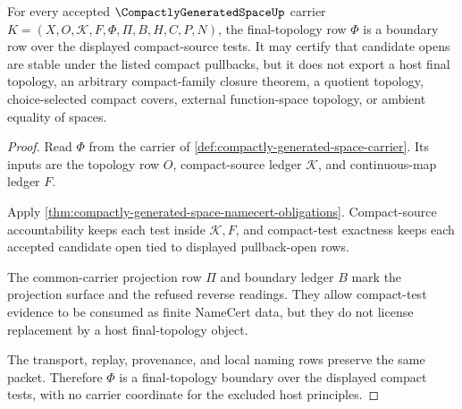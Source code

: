 \begin{theorem}\label{thm:compactly-generated-space-final-topology-boundary}
For every accepted $\CompactlyGeneratedSpaceUp$ carrier $K=(X,O,\mathcal K,F,\Phi,\Pi,B,H,C,P,N)$, the final-topology row $\Phi$ is a boundary row over the displayed compact-source tests. It may certify that candidate opens are stable under the listed compact pullbacks, but it does not export a host final topology, an arbitrary compact-family closure theorem, a quotient topology, choice-selected compact covers, external function-space topology, or ambient equality of spaces.
\end{theorem}
\begin{proof}
Read $\Phi$ from the carrier of \autoref{def:compactly-generated-space-carrier}. Its inputs are the topology row $O$, compact-source ledger $\mathcal K$, and continuous-map ledger $F$.

Apply \autoref{thm:compactly-generated-space-namecert-obligations}. Compact-source accountability keeps each test inside $\mathcal K,F$, and compact-test exactness keeps each accepted candidate open tied to displayed pullback-open rows.

The common-carrier projection row $\Pi$ and boundary ledger $B$ mark the projection surface and the refused reverse readings. They allow compact-test evidence to be consumed as finite NameCert data, but they do not license replacement by a host final-topology object.

The transport, replay, provenance, and local naming rows preserve the same packet. Therefore $\Phi$ is a final-topology boundary over the displayed compact tests, with no carrier coordinate for the excluded host principles.
\end{proof}



